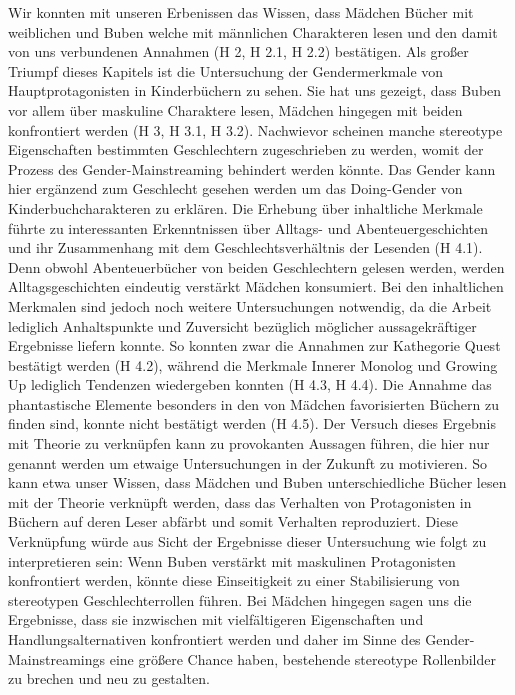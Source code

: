 Wir konnten mit unseren Erbenissen das Wissen, dass Mädchen Bücher mit
weiblichen und Buben welche mit männlichen Charakteren lesen und den
damit von uns verbundenen Annahmen (H 2, H 2.1, H 2.2) bestätigen. Als
großer Triumpf dieses Kapitels ist die Untersuchung der Gendermerkmale
von Hauptprotagonisten in Kinderbüchern zu sehen. Sie hat uns gezeigt,
dass Buben vor allem über maskuline Charaktere lesen, Mädchen hingegen
mit beiden konfrontiert werden (H 3, H 3.1, H 3.2). Nachwievor scheinen
manche stereotype Eigenschaften bestimmten Geschlechtern zugeschrieben
zu werden, womit der Prozess des Gender-Mainstreaming behindert werden
könnte. Das Gender kann hier ergänzend zum Geschlecht gesehen werden um
das Doing-Gender von Kinderbuchcharakteren zu erklären. Die Erhebung
über inhaltliche Merkmale führte zu interessanten Erkenntnissen über
Alltags- und Abenteuergeschichten und ihr Zusammenhang mit dem
Geschlechtsverhältnis der Lesenden (H 4.1). Denn obwohl Abenteuerbücher
von beiden Geschlechtern gelesen werden, werden Alltagsgeschichten
eindeutig verstärkt Mädchen konsumiert. Bei den inhaltlichen Merkmalen
sind jedoch noch weitere Untersuchungen notwendig, da die Arbeit
lediglich Anhaltspunkte und Zuversicht bezüglich möglicher
aussagekräftiger Ergebnisse liefern konnte. So konnten zwar die Annahmen
zur Kathegorie Quest bestätigt werden (H 4.2), während die Merkmale
Innerer Monolog und Growing Up lediglich Tendenzen wiedergeben konnten
(H 4.3, H 4.4). Die Annahme das phantastische Elemente besonders in den
von Mädchen favorisierten Büchern zu finden sind, konnte nicht bestätigt
werden (H 4.5). Der Versuch dieses Ergebnis mit Theorie zu verknüpfen
kann zu provokanten Aussagen führen, die hier nur genannt werden um
etwaige Untersuchungen in der Zukunft zu motivieren. So kann etwa unser
Wissen, dass Mädchen und Buben unterschiedliche Bücher lesen mit der
Theorie verknüpft werden, dass das Verhalten von Protagonisten in
Büchern auf deren Leser abfärbt und somit Verhalten reproduziert. Diese
Verknüpfung würde aus Sicht der Ergebnisse dieser Untersuchung wie folgt
zu interpretieren sein: Wenn Buben verstärkt mit maskulinen
Protagonisten konfrontiert werden, könnte diese Einseitigkeit zu einer
Stabilisierung von stereotypen Geschlechterrollen führen. Bei Mädchen
hingegen sagen uns die Ergebnisse, dass sie inzwischen mit
vielfältigeren Eigenschaften und Handlungsalternativen konfrontiert
werden und daher im Sinne des Gender-Mainstreamings eine größere Chance
haben, bestehende stereotype Rollenbilder zu brechen und neu zu
gestalten.

